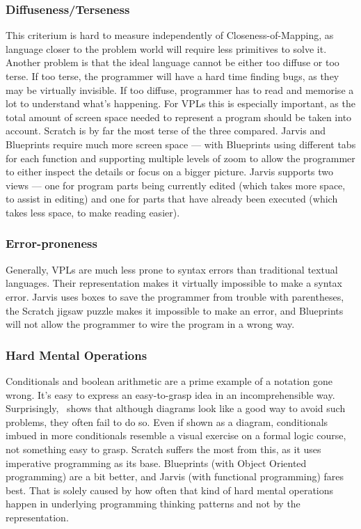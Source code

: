 \documentclass[english,mgr,shortabstract]{iithesis}
\begin{document}
\subsubsection*{Diffuseness/Terseness}
This criterium is hard to measure independently of Closeness-of-Mapping, as
language closer to the problem world will require less primitives to solve it.
Another problem is that the ideal language cannot be either too diffuse or too
terse.
If too terse, the programmer will have a hard time finding bugs, as they may be
virtually invisible.
If too diffuse, programmer has to read and memorise a lot to understand what’s
happening.
For VPLs this is especially important, as the total amount of screen space
needed to represent a program should be taken into account.
Scratch is by far the most terse of the three compared.
Jarvis and Blueprints require much more screen space --- with Blueprints using
different tabs for each function and supporting multiple levels of zoom to allow
the programmer to either inspect the details or focus on a bigger picture.
Jarvis supports two views --- one for program parts being currently edited (which
takes more space, to assist in editing) and one for parts that have already been
executed (which takes less space, to make reading easier).

\subsubsection*{Error-proneness}
Generally, VPLs are much less prone to syntax errors than traditional textual
languages.
Their representation makes it virtually impossible to make a syntax error.
Jarvis uses boxes to save the programmer from trouble with parentheses, the
Scratch jigsaw puzzle makes it impossible to make an error, and Blueprints will
not allow the programmer to wire the program in a wrong way.

\subsubsection*{Hard Mental Operations}
Conditionals and boolean arithmetic are a prime example of a notation gone
wrong.
It’s easy to express an easy-to-grasp idea in an incomprehensible way.
Surprisingly,~\cite{Green96UsabilityAnalysis} shows that although diagrams look
like a good way to avoid such problems, they often fail to do so.
Even if shown as a diagram, conditionals imbued in more conditionals resemble a
visual exercise on a formal logic course, not something easy to grasp.
Scratch suffers the most from this, as it uses imperative programming as its
base.
Blueprints (with Object Oriented programming) are a bit better, and Jarvis (with
functional programming) fares best.
That is solely caused by how often that kind of hard mental operations happen in
underlying programming thinking patterns and not by the representation.
\end{document}
